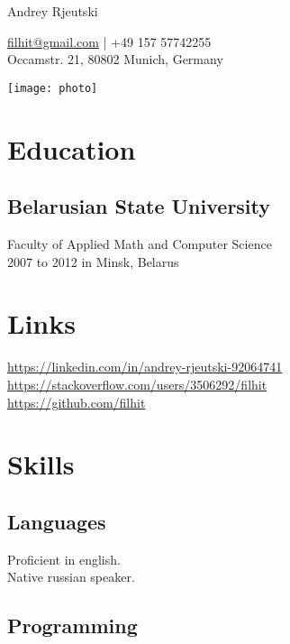 \documentclass[a4paper,11pt]{article}
\newcommand{\periodinminsk}[1]{{\small #1 in Minsk, Belarus}}
\begin{document}
  \begin{minipage}{0.69\textwidth}
    \begin{centering}
      {\Huge Andrey Rjeutski}

      \href{mailto:filhit@gmail.com}{filhit@gmail.com} | +49 157 57742255\\
      Occamstr. 21, 80802 Munich, Germany
	  
	\end{centering}
  \end{minipage}
  \begin{minipage}{0.3\textwidth}
    \texttt{[image: photo]}
  \end{minipage}
  
  \vspace{0.5cm}
  \begin{minipage}[t]{0.34\textwidth}
    \section*{Education} 
    \subsection*{Belarusian State University}
    Faculty of Applied Math and Computer Science\\
	\periodinminsk{2007 to 2012}
    \section*{Links} 
    \href{https://linkedin.com/in/andrey-rjeutski-92064741}{https://linkedin.com/in/andrey-rjeutski-92064741}\\
    \href{https://stackoverflow.com/users/3506292/filhit}{https://stackoverflow.com/\allowbreak users/3506292/filhit}\\
	\href{https://github.com/filhit}{https://github.com/filhit}
    \section*{Skills}
	\subsection*{Languages}
    Proficient in english.\\
    Native russian speaker.
    \subsection*{Programming}

\end{minipage}
\end{document}
